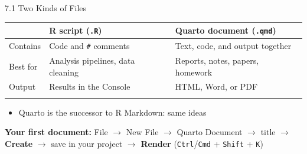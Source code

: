 \documentclass[
  ignorenonframetext,
  aspectratio=169,
]{beamer}
\newcounter{none} %
\providecommand{\tightlist}{%
  \setlength{\itemsep}{0pt}\setlength{\parskip}{0pt}}
\begin{document}
\begin{frame}[fragile]{7.1 Two Kinds of Files}
\protect{}\label{two-kinds-of-files}
{\def\LTcaptype{none} %
\begin{longtable}[]{@{}
  >{\raggedright\arraybackslash}p{}
  >{\raggedright\arraybackslash}p{}
  >{\raggedright\arraybackslash}p{}@{}}
\toprule\noalign{}
\begin{minipage}[b]{\linewidth}\raggedright
\end{minipage} & \begin{minipage}[b]{\linewidth}\raggedright
R script (\texttt{.R})
\end{minipage} & \begin{minipage}[b]{\linewidth}\raggedright
Quarto document (\texttt{.qmd})
\end{minipage} \\
\midrule\noalign{}
\endhead
Contains & Code and \texttt{\#} comments & Text, code, and output
together \\
Best for & Analysis pipelines, data cleaning & Reports, notes, papers,
homework \\
Output & Results in the Console & HTML, Word, or PDF \\
\bottomrule\noalign{}
\end{longtable}
}

\begin{itemize}
\tightlist
\item
  Quarto is the successor to R Markdown: same ideas
\end{itemize}

\textbf{Your first document:} File \(\rightarrow\) New File
\(\rightarrow\) Quarto Document \(\rightarrow\) title \(\rightarrow\)
\textbf{Create} \(\rightarrow\) save in your project \(\rightarrow\)
\textbf{Render} (\texttt{Ctrl}/\texttt{Cmd} + \texttt{Shift} +
\texttt{K})
\end{frame}
\end{document}
